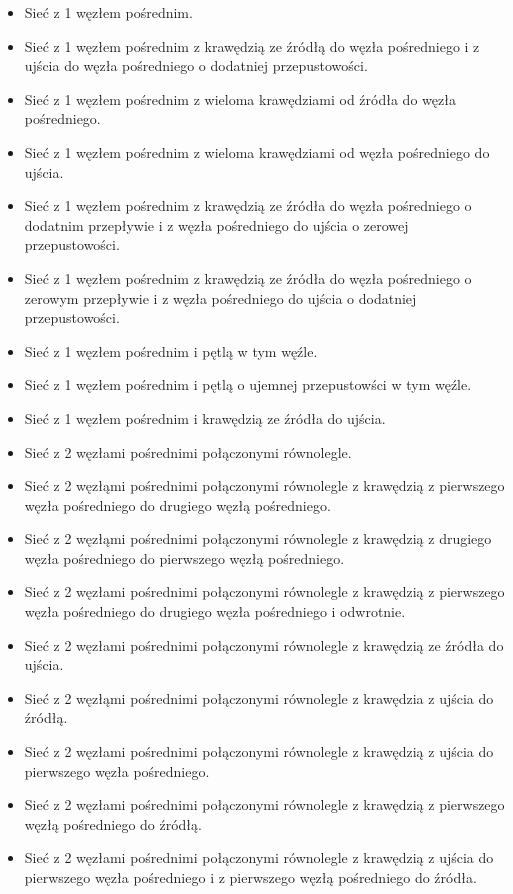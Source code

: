 \documentclass[10pt]{dokument-tiwo}
\begin{document}
\begin{itemize}
    \item Sieć z 1 węzłem pośrednim.
    \item Sieć z 1 węzłem pośrednim z krawędzią ze źródłą do węzła pośredniego i z ujścia do węzła pośredniego o dodatniej przepustowości.
    \item Sieć z 1 węzłem pośrednim z wieloma krawędziami od źródła do węzła pośredniego.
    \item Sieć z 1 węzłem pośrednim z wieloma krawędziami od węzła pośredniego do ujścia.
    \item Sieć z 1 węzłem pośrednim z krawędzią ze źródła do węzła pośredniego o dodatnim przepływie i z węzła pośredniego do ujścia o zerowej przepustowości.
    \item Sieć z 1 węzłem pośrednim z krawędzią ze źródła do węzła pośredniego o zerowym przepływie i z węzła pośredniego do ujścia o dodatniej przepustowości.
    \item Sieć z 1 węzłem pośrednim i pętlą w tym węźle.
    \item Sieć z 1 węzłem pośrednim i pętlą o ujemnej przepustowści w tym węźle.
    \item Sieć z 1 węzłem pośrednim i krawędzią ze źródła do ujścia.
\end{itemize}
\begin{itemize}
    \item Sieć z 2 węzłami pośrednimi połączonymi równolegle.
    \item Sieć z 2 węzłąmi pośrednimi połączonymi równolegle z krawędzią z pierwszego węzła pośredniego do drugiego węzłą pośredniego.%
    \item Sieć z 2 węzłąmi pośrednimi połączonymi równolegle z krawędzią z drugiego węzła pośredniego do pierwszego węzłą pośredniego.%
    \item Sieć z 2 węzłami pośrednimi połączonymi równolegle z krawędzią z pierwszego węzła pośredniego do drugiego węzła pośredniego i odwrotnie.%
    \item Sieć z 2 węzłami pośrednimi połączonymi równolegle z krawędzią ze źródła do ujścia.
    \item Sieć z 2 węzłąmi pośrednimi połączonymi równolegle z krawędzia z ujścia do źródłą.
    \item Sieć z 2 węzłami pośrednimi połączonymi równolegle z krawędzią z ujścia do pierwszego węzła pośredniego.
    \item Sieć z 2 węzłami pośrednimi połączonymi równolegle z krawędzią z pierwszego węzłą pośredniego do źródłą.
    \item Sieć z 2 węzłami pośrednimi połączonymi równolegle z krawędzią z ujścia do pierwszego węzła pośredniego i z pierwszego węzłą pośredniego do źródła.
\end{itemize}
\end{document}
